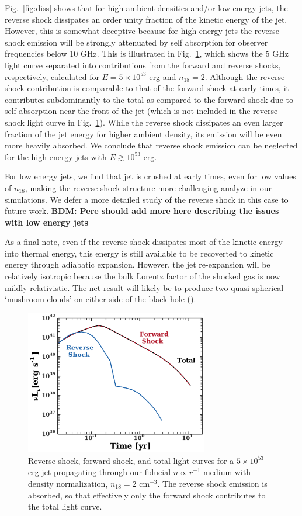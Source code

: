 \documentclass[usenatbib,fleqn]{mnras}
\begin{document}
Fig.~\ref{fig:diss} shows that for high ambient densities and/or low
energy jets, the reverse shock dissipates an order unity fraction of
the kinetic energy of the jet.  However, this is somewhat deceptive
because for high energy jets the reverse shock emission will be
strongly attenuated by self absorption for observer frequencies below
10 GHz.  This is illustrated in Fig.~\ref{fig:reverse}, which shows
the 5 GHz light curve separated into contributions from the forward
and reverse shocks, respectively, calculated for $E = 5\times 10^{53}$
erg and $n_{18} = 2$.  Although the reverse shock contribution is
comparable to that of the forward shock at early times, it contributes
subdominantly to the total as compared to the forward shock due to
self-absorption near the front of the jet (which is not included in
the reverse shock light curve in Fig.~\ref{fig:reverse}).  While the
reverse shock dissipates an even larger fraction of the jet energy for
higher ambient density, its emission will be even more heavily
absorbed.  We conclude that reverse shock emission can be neglected
for the high energy jets with $E\gtrsim 10^{53}$ erg.

For low energy jets, we find that jet is crushed at early times, even
for low values of $n_{18}$, making the reverse shock structure more
challenging analyze in our simulations.  We defer a more detailed
study of the reverse shock in this case to future work.  {\bf BDM:
  Pere should add more here describing the issues with low energy
  jets}

As a final note, even if the reverse shock dissipates most of the
kinetic energy into thermal energy, this energy is still available to
be recoverted to kinetic energy through adiabatic expansion.  However,
the jet re-expansion will be relatively isotropic because the bulk
Lorentz factor of the shocked gas is now mildly relativistic.  The net
result will likely be to produce two quasi-spherical `mushroom clouds' on
either side of the black hole (\citealt{Giannios&Metzger2011}).


\begin{figure}
  \includegraphics[width=8cm]{reverse.pdf}
  \caption{\label{fig:reverse} Reverse shock, forward shock, and total
    light curves for a $5\times 10^{53}$ erg jet propagating through
    our fiducial $n\propto r^{-1}$ medium with density normalization,
    $n_{18}=2$ cm$^{-3}$. The reverse shock emission is absorbed, so
    that effectively only the forward shock contributes to the total
    light curve.}
\end{figure}
\end{document}
